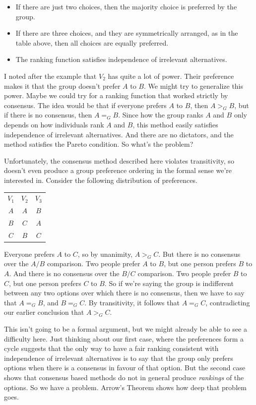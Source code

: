 \documentclass[openany]{book}
\begin{document}
\begin{itemize}
\item If there are just two choices, then the majority choice is preferred by the group.
\item If there are three choices, and they are symmetrically arranged, as in the table above, then all choices are equally preferred.
\item The ranking function satisfies independence of irrelevant alternatives.
\end{itemize}
I noted after the example that $V_2$ has quite a lot of power. Their preference makes it that the group doesn't prefer $A$ to $B$. We might try to generalize this power. Maybe we could try for a ranking function that worked strictly by consensus. The idea would be that if everyone prefers $A$ to $B$, then $A >_G B$, but if there is no consensus, then $A =_G B$. Since how the group ranks $A$ and $B$ only depends on how individuals rank $A$ and $B$, this method easily satisfies independence of irrelevant alternatives. And there are no dictators, and the method satisfies the Pareto condition. So what's the problem?

Unfortunately, the consensus method described here violates transitivity, so doesn't even produce a group preference ordering in the formal sense we're interested in. Consider the following distribution of preferences.

\begin{center}
\begin{tabular}{c c c}
$V_1$ & $V_2$ & $V_3$ \\ 
$A$ & $A$ & $B$ \\
$B$ & $C$ & $A$ \\
$C$ & $B$ & $C$
\end{tabular}
\end{center}
Everyone prefers $A$ to $C$, so by unanimity, $A >_G C$. But there is no consensus over the $A/B$ comparison. Two people prefer $A$ to $B$, but one person prefers $B$ to $A$. And there is no consensus over the $B/C$ comparison. Two people prefer $B$ to $C$, but one person prefers $C$ to $B$. So if we're saying the group is indifferent between any two options over which there is no consensus, then we have to say that $A =_G B$, and $B =_G C$. By transitivity, it follows that $A =_G C$, contradicting our earlier conclusion that $A >_G C$.

This isn't going to be a formal argument, but we might already be able to see a difficulty here. Just thinking about our first case, where the preferences form a cycle suggests that the only way to have a fair ranking consistent with independence of irrelevant alternatives is to say that the group only prefers options when there is a consensus in favour of that option. But the second case shows that consensus based methods do not in general produce \textit{rankings} of the options. So we have a problem. Arrow's Theorem shows how deep that problem goes.
\end{document}
